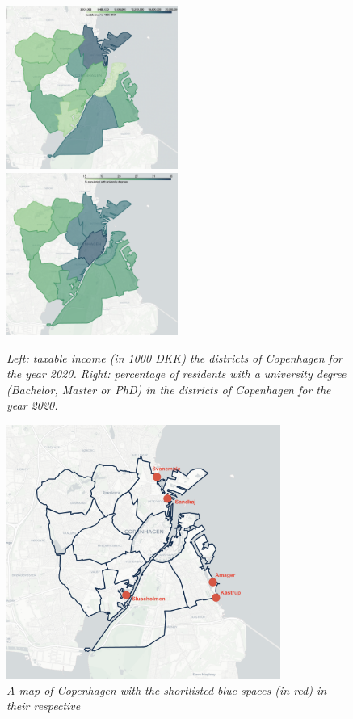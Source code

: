 \documentclass{article}
\begin{document}
\begin{figure}[h]
	\includegraphics[width=0.5\textwidth]{copenhagen_income_taxable.png}
	\includegraphics[width=0.5\textwidth]{copenhagen_edu.png}
	\caption{\textit{Left: taxable income (in 1000 DKK) the districts of Copenhagen for the year 2020. Right: percentage of residents with a university degree (Bachelor, Master or PhD) in the districts of Copenhagen for the year 2020.}}
	  \label{fig:map_income}
\end{figure}

\begin{figure}[h]
	\centering
	\includegraphics[width=0.8\textwidth]{copenhagen_bs_shortlist.png}
	\caption{\textit{A map of Copenhagen with the shortlisted blue spaces (in red) in their respective}}
	  \label{fig:ubs}
\end{figure}
\end{document}
